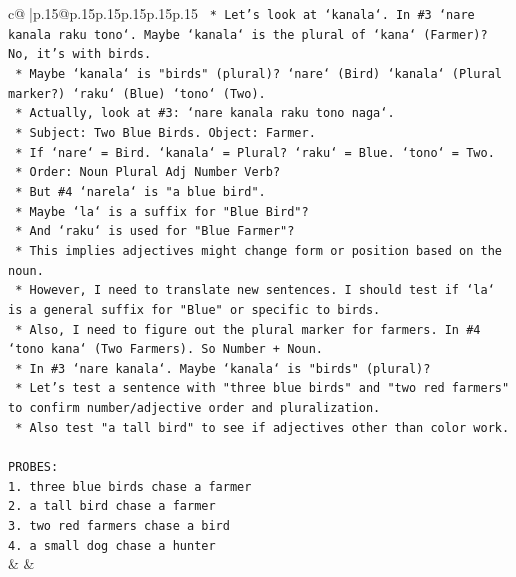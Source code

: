 \documentclass{article}
\begin{document}
{\begin{supertabular}{c@{$\;$}|p{.15\linewidth}@{}p{.15\linewidth}p{.15\linewidth}p{.15\linewidth}p{.15\linewidth}p{.15\linewidth}}
{{{\texttt{        *   Let's look at `kanala`. In \#3 `nare kanala raku tono`. Maybe `kanala` is the plural of `kana` (Farmer)? No, it's with birds.} \\
\texttt{        *   Maybe `kanala` is "birds" (plural)? `nare` (Bird) `kanala` (Plural marker?) `raku` (Blue) `tono` (Two).} \\
\texttt{        *   Actually, look at \#3: `nare kanala raku tono naga`.} \\
\texttt{            *   Subject: Two Blue Birds. Object: Farmer.} \\
\texttt{            *   If `nare` = Bird. `kanala` = Plural? `raku` = Blue. `tono` = Two.} \\
\texttt{            *   Order: Noun Plural Adj Number Verb?} \\
\texttt{            *   But \#4 `narela` is "a blue bird".} \\
\texttt{            *   Maybe `la` is a suffix for "Blue Bird"?} \\
\texttt{            *   And `raku` is used for "Blue Farmer"?} \\
\texttt{            *   This implies adjectives might change form or position based on the noun.} \\
\texttt{            *   However, I need to translate new sentences. I should test if `la` is a general suffix for "Blue" or specific to birds.} \\
\texttt{            *   Also, I need to figure out the plural marker for farmers. In \#4 `tono kana` (Two Farmers). So Number + Noun.} \\
\texttt{            *   In \#3 `nare kanala`. Maybe `kanala` is "birds" (plural)?} \\
\texttt{            *   Let's test a sentence with "three blue birds" and "two red farmers" to confirm number/adjective order and pluralization.} \\
\texttt{            *   Also test "a tall bird" to see if adjectives other than color work.} \\
\\ 
\texttt{PROBES:} \\
\texttt{1. three blue birds chase a farmer} \\
\texttt{2. a tall bird chase a farmer} \\
\texttt{3. two red farmers chase a bird} \\
\texttt{4. a small dog chase a hunter} \\
            }
        }
    }
    & & \\ \\


\end{supertabular}}
\end{document}
